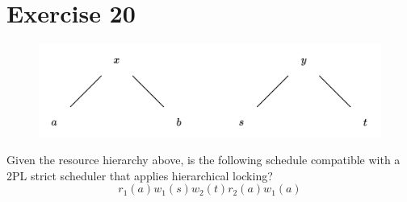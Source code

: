 \section{Exercise 20}

\begin{figure}[H]
    \centering
    \includegraphics[width=0.75\linewidth]{images/HL1.png}
\end{figure}
Given the resource hierarchy above, is the following schedule compatible with a 2PL strict scheduler that applies hierarchical locking?
\[r_1(a) w_1(s) w_2(t) r_2(a) w_1(a)\]

